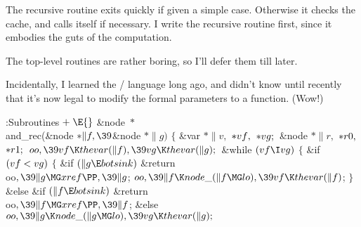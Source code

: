The recursive routine exits quickly if given a simple case.
Otherwise it checks the cache, and calls itself if necessary.
I write the recursive routine first, since it embodies the guts
of the computation. %

The top-level routines are rather boring, so I'll defer them till later.

Incidentally, I learned the \CEE/ language long ago, and didn't know
until recently that it's now legal to modify the formal parameters
to a function. (Wow!)

\Y\B\4:Subroutines\X${}\mathrel+\E{}$\6
\&{node} ${}{*}{}$\\{and\_rec}(\&{node} ${}{*}\|f,\39{}$\&{node} ${}{*}\|g){}$%
\1\1\2\2\6
${}\{{}$\1\6
\&{var} ${}{*}\|v,{}$ ${}{*}\\{vf},{}$ ${}{*}\\{vg};{}$\6
\&{node} ${}{*}\|r,{}$ ${}{*}\\{r0},{}$ ${}{*}\\{r1};{}$\7
${}\\{oo},\39\\{vf}\K\\{thevar}(\|f),\39\\{vg}\K\\{thevar}(\|g);{}$\6
\&{while} ${}(\\{vf}\I\\{vg}){}$\5
${}\{{}$\1\6
\&{if} ${}(\\{vf}<\\{vg}){}$\5
${}\{{}$\1\6
\&{if} ${}(\|g\E\\{botsink}){}$\1\5
\&{return} \\{oo}${},\39\|g\MG\\{xref}\PP,\39\|g{}$;\2\6
${}\\{oo},\39\|f\K\\{node\_}(\|f\MG\\{lo}),\39\\{vf}\K\\{thevar}(\|f){}$;\6
\4${}\}{}$\2\6
\&{else} \&{if} ${}(\|f\E\\{botsink}){}$\1\5
\&{return} \\{oo}${},\39\|f\MG\\{xref}\PP,\39\|f{}$;\2\6
\&{else}\1\5
${}\\{oo},\39\|g\K\\{node\_}(\|g\MG\\{lo}),\39\\{vg}\K\\{thevar}(\|g);{}$\2\6
